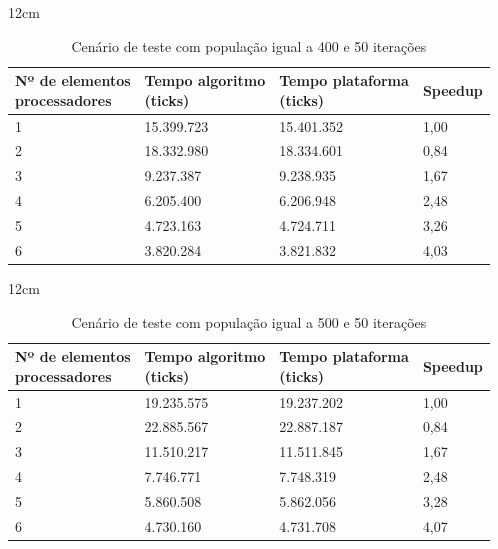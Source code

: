 \begin{table}[h]{12cm}
    \caption{Cenário de teste com população igual a 400 e 50 iterações}
    \label{tbl:taylor-vortex-parameters}
    \begin{tabular}{llll}
        \hline
        \shortstack[l]{Nº de elementos \\ processadores} & \shortstack[l]{Tempo algoritmo \\ (ticks)} & \shortstack[l]{Tempo plataforma \\ (ticks)} & Speedup \\
        \hline
        1 & 15.399.723 & 15.401.352 & 1,00 \\
        2 & 18.332.980 & 18.334.601 & 0,84 \\
        3 & 9.237.387  & 9.238.935  & 1,67 \\
        4 & 6.205.400  & 6.206.948  & 2,48 \\
        5 & 4.723.163  & 4.724.711  & 3,26 \\
        6 & 3.820.284  & 3.821.832  & 4,03 \\
        \hline
    \end{tabular}
\end{table}

\begin{table}[h]{12cm}
    \caption{Cenário de teste com população igual a 500 e 50 iterações}
    \label{tbl:taylor-vortex-parameters}
    \begin{tabular}{llll}
        \hline
        \shortstack[l]{Nº de elementos \\ processadores} & \shortstack[l]{Tempo algoritmo \\ (ticks)} & \shortstack[l]{Tempo plataforma \\ (ticks)} & Speedup \\
        \hline
        1 & 19.235.575 & 19.237.202 & 1,00 \\
        2 & 22.885.567 & 22.887.187 & 0,84 \\
        3 & 11.510.217 & 11.511.845 & 1,67 \\
        4 & 7.746.771  & 7.748.319  & 2,48 \\
        5 & 5.860.508  & 5.862.056  & 3,28 \\
        6 & 4.730.160  & 4.731.708  & 4,07 \\
        \hline
    \end{tabular}
\end{table}

